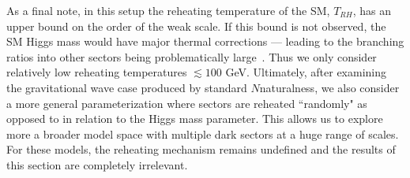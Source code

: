 \documentclass[nofootinbib,twocolumn,preprintnumbers]{revtex4-1}
\begin{document}
As a final note, in this setup the reheating temperature of the SM, $T_{RH}$, has an upper bound on the order of the weak scale. If this bound is not observed, the SM Higgs mass would have major thermal corrections --- leading to the branching ratios into other sectors being problematically large~\citep{Arkani-Hamed:2016rle}. Thus we only consider relatively low reheating temperatures $\lesssim 100$ GeV.
Ultimately, after examining the gravitational wave case produced by standard $N$naturalness, we also consider a more general parameterization where sectors are reheated ``randomly" as opposed to in relation to the Higgs mass parameter. This allows us to explore more a broader model space with multiple dark sectors at a huge range of scales. For these models, the reheating mechanism remains undefined and the results of this section are completely irrelevant. 
\end{document}
